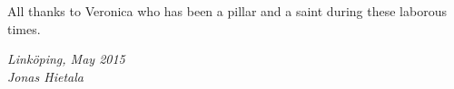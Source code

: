 \begin{acknowledgments}
  All thanks to Veronica who has been a pillar and a saint during these laborous times.

  \addvspace{1em}
  \begin{flushright}
    \textit{%
      Linköping, May 2015\\
      Jonas Hietala%
    }
  \end{flushright}
\end{acknowledgments}
